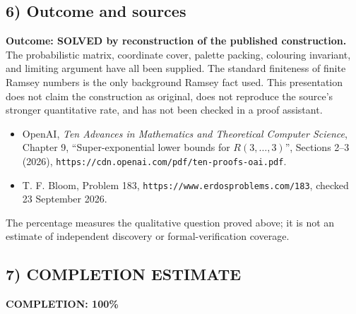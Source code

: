 \subsection{6) Outcome and sources}
\textbf{Outcome: SOLVED by reconstruction of the published construction.}
The probabilistic matrix, coordinate cover, palette packing, colouring
invariant, and limiting argument have all been supplied. The standard
finiteness of finite Ramsey numbers is the only background Ramsey fact
used. This presentation does not claim the construction as original,
does not reproduce the source's stronger quantitative rate, and has
not been checked in a proof assistant.
\begin{itemize}
\item OpenAI, \emph{Ten Advances in Mathematics and Theoretical
Computer Science}, Chapter 9, ``Super-exponential lower
bounds for $R(3,\ldots,3)$'', Sections 2--3 (2026),
\texttt{https://cdn.openai.com/pdf/ten-proofs-oai.pdf}.
\item T. F. Bloom, Problem 183,
\texttt{https://www.erdosproblems.com/183}, checked 23 September 2026.
\end{itemize}
The percentage measures the qualitative question proved above; it is
not an estimate of independent discovery or formal-verification coverage.
\subsection{7) COMPLETION ESTIMATE}
\textbf{COMPLETION: 100\%}
